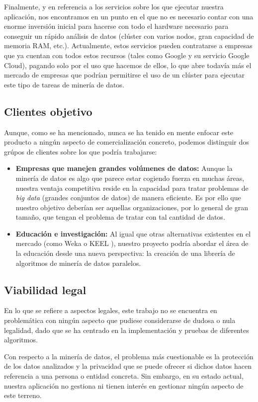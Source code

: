 Finalmente, y en referencia a los servicios sobre los que ejecutar nuestra aplicación, nos encontramos en un punto en el que no es necesario contar con una enorme inversión inicial para hacerse con todo el hardware necesario para conseguir un rápido análisis de datos (clúster con varios nodos, gran capacidad de memoria RAM, etc.). Actualmente, estos servicios pueden contratarse a empresas que ya cuentan con todos estos recursos (tales como Google y su servicio Google Cloud), pagando solo por el uso que hacemos de ellos, lo que abre todavía más el mercado de empresas que podrían permitirse el uso de un clúster para ejecutar este tipo de tareas de minería de datos.

\subsection{Clientes objetivo}

Aunque, como se ha mencionado, nunca se ha tenido en mente enfocar este producto a ningún aspecto de comercialización concreto, podemos distinguir dos grúpos de clientes sobre los que podría trabajarse:

\begin{itemize}
\item \textbf{Empresas que manejen grandes volúmenes de datos:} Aunque la minería de datos es algo que parece estar cogiendo fuerza en muchas áreas, nuestra ventaja competitiva reside en la capacidad para tratar problemas de \textit{big data} (grandes conjuntos de datos) de manera eficiente. Es por ello que nuestro objetivo deberían ser aquellas organizaciones, por lo general de gran tamaño, que tengan el problema de tratar con tal cantidad de datos.
\item \textbf{Educación e investigación:} Al igual que otras alternativas existentes en el mercado (como Weka \cite{WekaSoft} o KEEL \cite{KEELSoft1, KEELSoft2}), nuestro proyecto podría abordar el área de la educación desde una nueva perspectiva: la creación de una librería de algoritmos de minería de datos paralelos.
\end{itemize}

\subsection{Viabilidad legal}

En lo que se refiere a aspectos legales, este trabajo no se encuentra en problemática con ningún aspecto que pudiese considerarse de dudosa o nula legalidad, dado que se ha centrado en la implementación y pruebas de diferentes algoritmos.

Con respecto a la minería de datos, el problema más cuestionable es la protección de los datos analizados y la privacidad que se puede ofrecer  si dichos datos hacen referencia a una persona o entidad concreta. Sin embargo, en su estado actual, nuestra aplicación no gestiona ni tienen interés en gestionar ningún aspecto de este terreno. 



